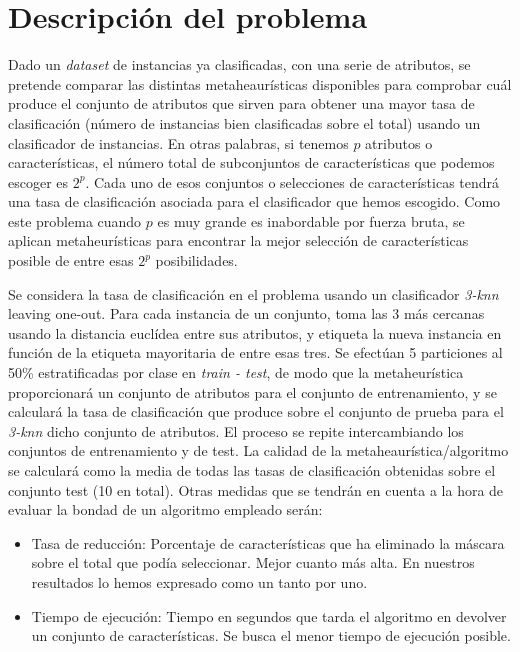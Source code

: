 \documentclass[a4paper,11pt]{article}
\newcommand{\imagent}[4]{
  \begin{wrapfigure}{#4}{0.7\textwidth}
    \begin{center}
    \texttt{[image: \#1]}
    \end{center}
    \caption{#3}
    \label{#4}
  \end{wrapfigure}
}
\newcommand{\imagen}[4]{
  \begin{minipage}{\linewidth}
    \centering
    \texttt{[image: \#1]}
    \captionof{figure}{#2}
    \label{#3}
  \end{minipage} 
}
\begin{document}
\newpage
\tableofcontents
\newpage

\section{Descripción del problema}
Dado un \textit{dataset} de instancias ya clasificadas, con una serie de atributos, se pretende comparar las distintas 
metaheaurísticas disponibles para comprobar cuál produce el conjunto de atributos que sirven para obtener una mayor 
tasa de clasificación (número de instancias bien clasificadas sobre el total) usando un clasificador de instancias.
En otras palabras, si tenemos $p$ atributos o características, el número total de subconjuntos de características que podemos
escoger es $2^p$. Cada uno de esos conjuntos o selecciones de características tendrá una tasa de clasificación asociada para
el clasificador que hemos escogido. Como este problema cuando $p$ es muy grande es inabordable por fuerza bruta, se aplican metaheurísticas para encontrar la mejor selección de características posible de entre esas $2^p$ posibilidades.

Se considera la tasa de clasificación en el problema usando un clasificador \textit{3-knn} leaving one-out. Para cada 
instancia de un conjunto, toma las 3 más cercanas usando la distancia euclídea entre sus atributos, y etiqueta la nueva
instancia en función de la etiqueta mayoritaria de entre esas tres. Se efectúan 5 particiones al 50\% estratificadas
por clase en \textit{train - test}, de modo que la metaheurística proporcionará un conjunto de atributos para el conjunto de
entrenamiento, y se calculará la tasa de clasificación que produce sobre el conjunto de prueba para el \textit{3-knn} dicho
conjunto de atributos. El proceso se repite intercambiando los conjuntos de entrenamiento y de test. La calidad de la 
metaheaurística/algoritmo se calculará como la media de todas las tasas de clasificación obtenidas sobre el conjunto test
(10 en total). Otras medidas que se tendrán en cuenta a la hora de evaluar la bondad de un algoritmo empleado serán:
\begin{itemize}
 \item Tasa de reducción: Porcentaje de características que ha eliminado la máscara sobre el total que podía 
 seleccionar. Mejor cuanto más alta. En nuestros resultados lo hemos expresado como un tanto por uno.
 \item Tiempo de ejecución: Tiempo en segundos que tarda el algoritmo en devolver un conjunto de características.
 Se busca el menor tiempo de ejecución posible.
\end{itemize}
\end{document}
